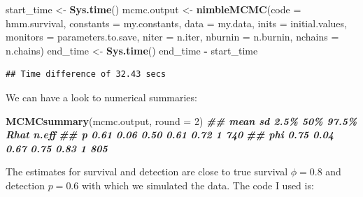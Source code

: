 \documentclass[
  12pt,
]{krantz}
\newenvironment{Shaded}{\begin{snugshade}}{\end{snugshade}}
\newcommand{\AttributeTok}[1]{\textcolor[rgb]{0.13,0.29,0.53}{#1}}
\newcommand{\DecValTok}[1]{\textcolor[rgb]{0.00,0.00,0.81}{#1}}
\newcommand{\DocumentationTok}[1]{\textcolor[rgb]{0.56,0.35,0.01}{\textbf{\textit{#1}}}}
\newcommand{\FunctionTok}[1]{\textcolor[rgb]{0.13,0.29,0.53}{\textbf{#1}}}
\newcommand{\NormalTok}[1]{#1}
\newcommand{\OtherTok}[1]{\textcolor[rgb]{0.56,0.35,0.01}{#1}}
\newcommand{\SpecialCharTok}[1]{\textcolor[rgb]{0.81,0.36,0.00}{\textbf{#1}}}
\begin{document}
\begin{Shaded}
\begin{Highlighting}[]
\NormalTok{start\_time }\OtherTok{\textless{}{-}} \FunctionTok{Sys.time}\NormalTok{()}
\NormalTok{mcmc.output }\OtherTok{\textless{}{-}} \FunctionTok{nimbleMCMC}\NormalTok{(}\AttributeTok{code =}\NormalTok{ hmm.survival,}
                          \AttributeTok{constants =}\NormalTok{ my.constants,}
                          \AttributeTok{data =}\NormalTok{ my.data,}
                          \AttributeTok{inits =}\NormalTok{ initial.values,}
                          \AttributeTok{monitors =}\NormalTok{ parameters.to.save,}
                          \AttributeTok{niter =}\NormalTok{ n.iter,}
                          \AttributeTok{nburnin =}\NormalTok{ n.burnin,}
                          \AttributeTok{nchains =}\NormalTok{ n.chains)}
\NormalTok{end\_time }\OtherTok{\textless{}{-}} \FunctionTok{Sys.time}\NormalTok{()}
\NormalTok{end\_time }\SpecialCharTok{{-}}\NormalTok{ start\_time}
\end{Highlighting}
\end{Shaded}

\begin{verbatim}
## Time difference of 32.43 secs
\end{verbatim}

We can have a look to numerical summaries:

\begin{Shaded}
\begin{Highlighting}[]
\FunctionTok{MCMCsummary}\NormalTok{(mcmc.output, }\AttributeTok{round =} \DecValTok{2}\NormalTok{)}
\DocumentationTok{\#\#     mean   sd 2.5\%  50\% 97.5\% Rhat n.eff}
\DocumentationTok{\#\# p   0.61 0.06 0.50 0.61  0.72    1   740}
\DocumentationTok{\#\# phi 0.75 0.04 0.67 0.75  0.83    1   805}
\end{Highlighting}
\end{Shaded}

The estimates for survival and detection are close to true survival \(\phi = 0.8\) and detection \(p = 0.6\) with which we simulated the data. The code I used is:
\end{document}
